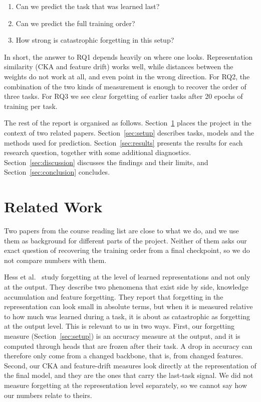 \documentclass[11pt,a4paper]{article}
\begin{document}
\begin{enumerate}
  \item[\textbf{RQ1}] Can we predict the task that was learned last?
  \item[\textbf{RQ2}] Can we predict the full training order?
  \item[\textbf{RQ3}] How strong is catastrophic forgetting in this setup?
\end{enumerate}

In short, the answer to RQ1 depends heavily on where one looks. Representation similarity (CKA and feature drift) works well, while distances between the weights do not work at all, and even point in the wrong direction. For RQ2, the combination of the two kinds of measurement is enough to recover the order of three tasks. For RQ3 we see clear forgetting of earlier tasks after 20 epochs of training per task.

The rest of the report is organised as follows. Section~\ref{sec:related} places the project in the context of two related papers. Section~\ref{sec:setup} describes tasks, models and the methods used for prediction. Section~\ref{sec:results} presents the results for each research question, together with some additional diagnostics. Section~\ref{sec:discussion} discusses the findings and their limits, and Section~\ref{sec:conclusion} concludes.

\section{Related Work}\label{sec:related}

Two papers from the course reading list are close to what we do, and we use them as background for different parts of the project. Neither of them asks our exact question of recovering the training order from a final checkpoint, so we do not compare numbers with them.

Hess et al.\ \cite{hess2024} study forgetting at the level of learned representations and not only at the output. They describe two phenomena that exist side by side, knowledge accumulation and feature forgetting. They report that forgetting in the representation can look small in absolute terms, but when it is measured relative to how much was learned during a task, it is about as catastrophic as forgetting at the output level. This is relevant to us in two ways. First, our forgetting measure (Section~\ref{sec:setup}) is an accuracy measure at the output, and it is computed through heads that are frozen after their task. A drop in accuracy can therefore only come from a changed backbone, that is, from changed features. Second, our CKA and feature-drift measures look directly at the representation of the final model, and they are the ones that carry the last-task signal. We did not measure forgetting at the representation level separately, so we cannot say how our numbers relate to theirs.
\end{document}
